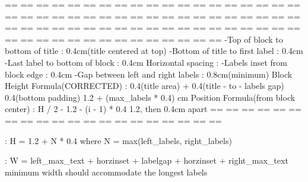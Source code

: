 \documentclass[border = 0pt] { standalone }
\begin{document}
    == == == == == == == == == == == == == == == == == == == == == == == == ==
    == == == == == == == == == == == == ==
    == == == == == == == == == == == == == == == == == == == == == == == == ==
    == == == == == == == ==
        -Top of block to bottom of title : 0.4cm(title centered at top) %
        -Bottom of title to first label : 0.4cm %
        -Last label to bottom of block : 0.4cm %
        Horizontal spacing
    : %
      -Labels inset from block edge : 0.4cm %
      -Gap between left and right labels : 0.8cm(minimum) %
      Block Height Formula(CORRECTED)
    : %
    0.4(title area) + 0.4(title - to - labels gap) %
    0.4(bottom padding) %
        1.2 + (max_labels * 0.4) cm %
        Position Formula(from block center)
    : %
            H / 2 - 1.2 - (i - 1) * 0.4 %
            1.2,
        then 0.4cm apart %
            == == == == == == == == == == == == == == == == == == ==
            ==

\newcommand{\vertspace} {0.4} %
\newcommand{\horzinset} {0.4} %
\newcommand{\labelgap} {0.8} %

    : H = 1.2 + N * 0.4 where N = max(left_labels, right_labels)
\newcommand{\blockheightone} {1.6cm} %
\newcommand{\blockheighttwo} {2.0cm} %
\newcommand{\blockheightthree} {2.4cm} %
\newcommand{\blockheightfour} {2.8cm} %
\newcommand{\blockheightfive} {3.2cm} %
\newcommand{\blockheightsix} {3.6cm} %
\newcommand{\blockheightseven} {4.0cm} %
\newcommand{\blockheighteight} {4.4cm} %

    : W = left_max_text + horzinset + labelgap + horzinset
          + right_max_text %
        minimum width should accommodate the longest labels
\end{document}
